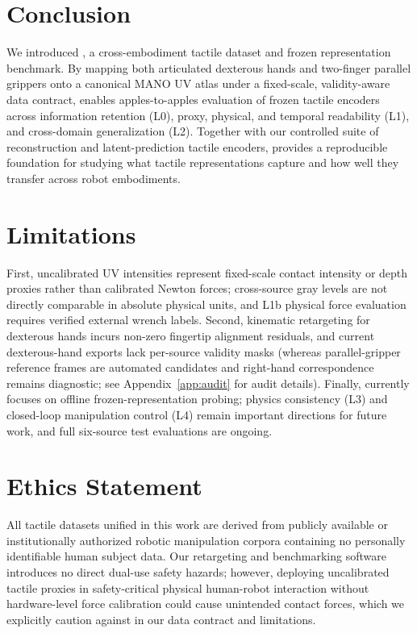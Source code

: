 \section{Conclusion}
\label{sec:conclusion}

We introduced \bench{}, a cross-embodiment tactile dataset and frozen representation benchmark.
By mapping both articulated dexterous hands and two-finger parallel grippers onto a canonical MANO UV atlas under a fixed-scale, validity-aware data contract, \bench{} enables apples-to-apples evaluation of frozen tactile encoders across information retention (L0), proxy, physical, and temporal readability (L1), and cross-domain generalization (L2).
Together with our controlled suite of reconstruction and latent-prediction tactile encoders, \bench{} provides a reproducible foundation for studying what tactile representations capture and how well they transfer across robot embodiments.

\section*{Limitations}
\label{sec:limitations}

First, uncalibrated UV intensities represent fixed-scale contact intensity or depth proxies rather than calibrated Newton forces; cross-source gray levels are not directly comparable in absolute physical units, and L1b physical force evaluation requires verified external wrench labels.
Second, kinematic retargeting for dexterous hands incurs non-zero fingertip alignment residuals, and current dexterous-hand exports lack per-source validity masks (whereas parallel-gripper reference frames are automated candidates and right-hand correspondence remains diagnostic; see Appendix~\ref{app:audit} for audit details).
Finally, \bench{} currently focuses on offline frozen-representation probing; physics consistency (L3) and closed-loop manipulation control (L4) remain important directions for future work, and full six-source test evaluations are ongoing.

\section*{Ethics Statement}
All tactile datasets unified in this work are derived from publicly available or institutionally authorized robotic manipulation corpora containing no personally identifiable human subject data.
Our retargeting and benchmarking software introduces no direct dual-use safety hazards; however, deploying uncalibrated tactile proxies in safety-critical physical human-robot interaction without hardware-level force calibration could cause unintended contact forces, which we explicitly caution against in our data contract and limitations.
